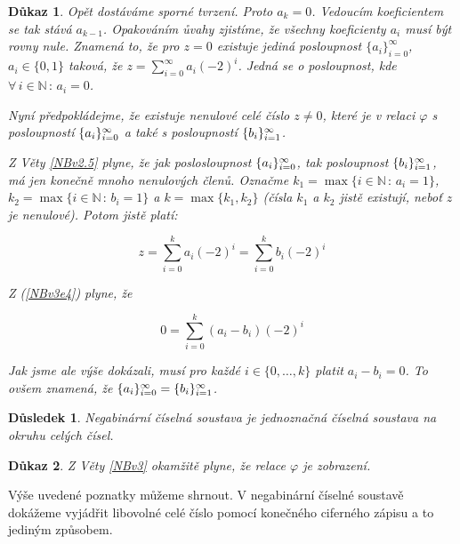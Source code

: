\documentclass[12pt]{book}
\newtheorem{dusledek}{Důsledek}
\newtheorem*{dukaz}{Důkaz}
\begin{document}
\begin{dukaz}
Opět dostáváme sporné tvrzení. Proto $a_k = 0$. Vedoucím koeficientem se tak stává $a_{k-1}$. Opakováním ůvahy zjistíme, že všechny koeficienty $a_i$ musí být rovny nule. Znamená to, že pro $z = 0$ existuje jediná posloupnost $\{a_i\}_{i=0}^\infty$, $a_i \in\{0,1\}$ taková, že $z = \sum_{i=0}^{\infty}a_i(-2)^i$. Jedná se o posloupnost, kde $\forall\,i\in \mathbb{N}\, :\, a_i = 0$.
\newline

	Nyní předpokládejme, že existuje nenulové celé číslo $z \neq 0$, které je v relaci $\varphi$ s posloupností $\{a_i\}_{i=0}^{\infty}$ a také s posloupností $\{b_i\}_{i=1}^{\infty}$.

Z Věty \ref{NBv2.5} plyne, že jak poslosloupnost $\{a_i\}_{i=0}^{\infty}$, tak posloupnost $\{b_i\}_{i=1}^{\infty}$, má jen konečně mnoho nenulových členů. Označme $k_1 = \max\{i \in \mathbb{N}\,:\, a_i = 1\}$, $k_2 = \max\{i \in \mathbb{N}\,:\, b_i = 1\}$ a $k = \max\{k_1, k_2\}$ (čísla $k_1$ a $k_2$ jistě existují, neboť $z$ je nenulové). Potom jistě platí:

\begin{equation}\label{NBv3e4}
  z=\sum_{i=0}^{k}a_i(-2)^i = \sum_{i=0}^{k}b_i(-2)^i
\end{equation}

Z (\ref{NBv3e4}) plyne, že 

\begin{equation}\label{NBv3e4}
  0 = \sum_{i=0}^{k}(a_i - b_i)(-2)^i 
\end{equation}

Jak jsme ale výše dokázali, musí pro každé $i \in \{0, \dots, k\}$ platit $a_i - b_i = 0$. To ovšem znamená, že $\{a_i\}_{i=0}^{\infty} = \{b_i\}_{i=1}^{\infty}$.

\end{dukaz}


\begin{dusledek}
  Negabinární číselná soustava je jednoznačná číselná soustava na okruhu celých čísel.
\end{dusledek}

\begin{dukaz}
Z Věty \ref{NBv3} okamžitě plyne, že relace $\varphi$ je zobrazení.
\end{dukaz}


Výše uvedené poznatky můžeme shrnout. V negabinární číselné soustavě dokážeme vyjádřit libovolné celé číslo pomocí konečného ciferného zápisu a to jediným způsobem.
\end{document}
